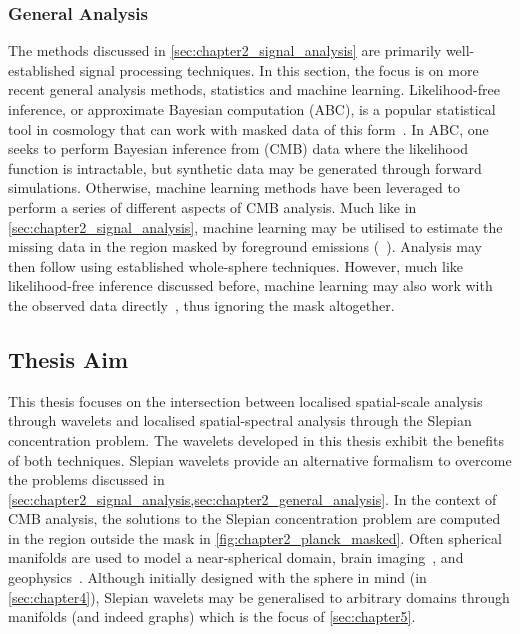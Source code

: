 \subsubsection{General Analysis}\label{sec:chapter2_general_analysis}

The methods discussed in \cref{sec:chapter2_signal_analysis} are primarily well-established signal processing techniques.
In this section, the focus is on more recent general analysis methods, \ie{} statistics and machine learning.
Likelihood-free inference, or approximate Bayesian computation (ABC), is a popular statistical tool in cosmology that can work with masked data of this form~\cite{Schafer2012,Alsing2018,Alsing2019}.
In ABC, one seeks to perform Bayesian inference from (CMB) data where the likelihood function is intractable, but synthetic data may be generated through forward simulations.
Otherwise, machine learning methods have been leveraged to perform a series of different aspects of CMB analysis.
Much like in \cref{sec:chapter2_signal_analysis}, machine learning may be utilised to estimate the missing data in the region masked by foreground emissions (\eg{}~\cite{Puglisi2020,Petroff2020,VafaeiSadr2021}).
Analysis may then follow using established whole-sphere techniques.
However, much like likelihood-free inference discussed before, machine learning may also work with the observed data directly~\cite{Chanda2021}, thus ignoring the mask altogether.

\subsection{Thesis Aim}\label{sec:chapter2_thesis_aim}

This thesis focuses on the intersection between localised spatial-scale analysis through wavelets and localised spatial-spectral analysis through the Slepian concentration problem.
The wavelets developed in this thesis exhibit the benefits of both techniques.
Slepian wavelets provide an alternative formalism to overcome the problems discussed in \cref{sec:chapter2_signal_analysis,sec:chapter2_general_analysis}.
In the context of CMB analysis, the solutions to the Slepian concentration problem are computed in the region outside the mask in \cref{fig:chapter2_planck_masked}.
Often spherical manifolds are used to model a near-spherical domain, \eg{} brain imaging~\cite{Hammond2011}, and geophysics~\cite{Pavlis2013}.
Although initially designed with the sphere in mind (in \cref{sec:chapter4}), Slepian wavelets may be generalised to arbitrary domains through manifolds (and indeed graphs) which is the focus of \cref{sec:chapter5}.
